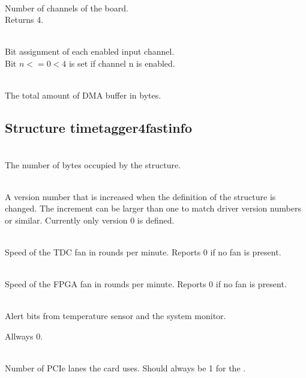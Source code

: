 			\\
			Number of channels of the board.\\
			Returns 4.\par

			\\
			Bit assignment of each enabled input channel.\\
			Bit $n <= 0 < 4$ is set if channel n is enabled. \par

			\\
			The total amount of DMA buffer in bytes.

		\subsection{Structure timetagger4\tu fast\tu info}

			\\
			The number of bytes occupied by the structure. \par

			\\
			A version number that is increased when the definition of the structure is changed. The increment can be larger than one to match driver version numbers or similar. Currently only version 0 is defined.\par


			\\
			Speed of the TDC fan in rounds per minute. Reports 0 if no fan is present.\par

			\\
			Speed of the FPGA fan in rounds per minute. Reports 0 if no fan is present.\par

			\\
			Alert bits from temperature sensor and the system monitor.
			\par

			Allways 0. \par

			\\
			Number of PCIe lanes the card uses. Should always be 1 for the \deviceName. \par

